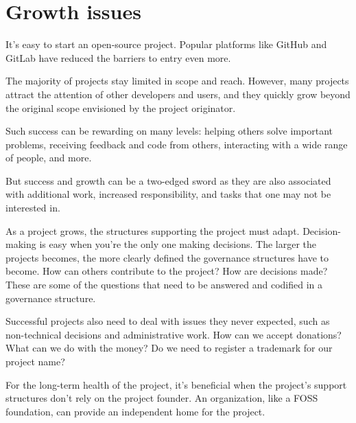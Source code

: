 


\chapter{Growth issues}

It's easy to start an open-source project.  Popular platforms like GitHub and GitLab have reduced the barriers to entry even more.

The majority of projects stay limited in scope and reach.  However, many projects attract the attention of other developers and users, and they quickly grow beyond the original scope envisioned by the project originator.

Such success can be rewarding on many levels: helping others solve important problems, receiving feedback and code from others, interacting with a wide range of people, and more.

But success and growth can be a two-edged sword as they are also associated with additional work, increased responsibility, and tasks that one may not be interested in.

As a project grows, the structures supporting the project must adapt.  Decision-making is easy when you're the only one making decisions.  The larger the projects becomes, the more clearly defined the governance structures have to become.  How can others contribute to the project?  How are decisions made?  These are some of the questions that need to be answered and codified in a governance structure.

Successful projects also need to deal with issues they never expected, such as non-technical decisions and administrative work.  How can we accept donations?  What can we do with the money?  Do we need to register a trademark for our project name?

For the long-term health of the project, it's beneficial when the project's support structures don't rely on the project founder.  An organization, like a FOSS foundation, can provide an independent home for the project.

